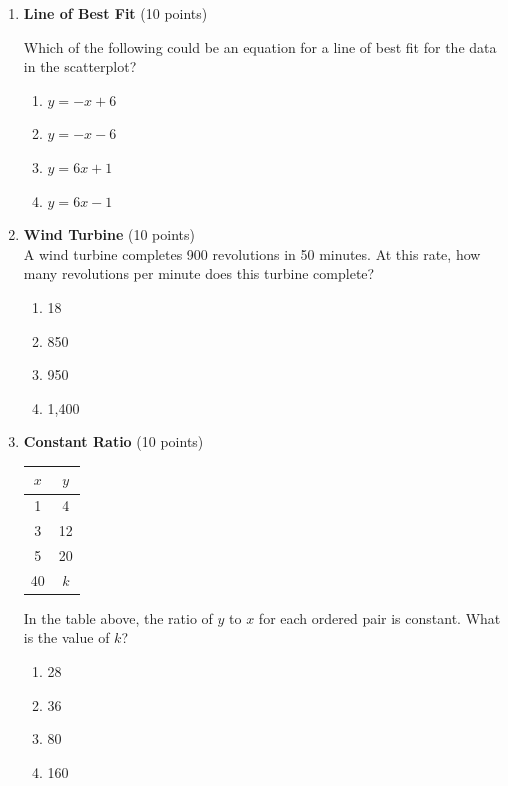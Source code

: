 \begin{enumerate}
  \newpage

  \item \textbf{Line of Best Fit} (10 points)\\

  Which of the following could be an equation for a line of best fit for the data in the scatterplot?
  \begin{enumerate}[label=(\Alph*)]
    \item $y=-x+6$
    \item $y=-x-6$
    \item $y=6x+1$
    \item $y=6x-1$
  \end{enumerate}
  \begin{subanswer}
  \end{subanswer}

  \item \textbf{Wind Turbine} (10 points)\\
  A wind turbine completes 900 revolutions in 50 minutes. At this rate, how many revolutions per minute does this turbine complete?
  \begin{enumerate}[label=(\Alph*)]
    \item 18
    \item 850
    \item 950
    \item 1,400
  \end{enumerate}
  \begin{subanswer}
  \end{subanswer}

  \item \textbf{Constant Ratio} (10 points)\\
  \begin{center}
  \begin{tabular}{|c|c|}
  \hline
  $x$ & $y$ \\
  \hline
  1 & 4 \\
  \hline
  3 & 12 \\
  \hline
  5 & 20 \\
  \hline
  40 & $k$ \\
  \hline
  \end{tabular}
  \end{center}

  In the table above, the ratio of $y$ to $x$ for each ordered pair is constant. What is the value of $k$?
  \begin{enumerate}[label=(\Alph*)]
    \item 28
    \item 36
    \item 80
    \item 160
  \end{enumerate}
  \begin{subanswer}
  \end{subanswer}


\end{enumerate}
